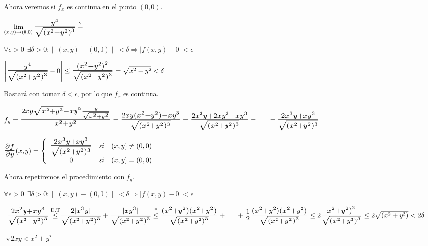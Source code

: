 \documentclass[10pt, titlepage]{article}
\newcommand{\eqc}[1]{\stackrel{\mathclap{\normalfont\mbox{\scriptsize{#1}}}}{=}}
\newcommand{\leqc}[1]{\stackrel{\mathclap{\normalfont\mbox{\scriptsize{#1}}}}{\leq}}
\newcommand{\bfrac}[2]{\scalebox{1.4}{$\frac{#1}{#2}$}}
\newcommand{\spac}{\, \, \,}
\newcommand{\limdef}[2]{$\forall \epsilon > 0 \spac \exists \delta > 0 : \|(x ,y) - #1\| < \delta \Rightarrow 
|f (x, y) - #2| < \epsilon$\vspace{3mm}

}
\begin{document}
Ahora veremos si $f_x$ es continua en el punto $(0, 0)$.
\vspace{3mm}

$\displaystyle \lim_{(x, y) \to (0, 0)} \bfrac{y^4}{\sqrt{{(x^2 + y^2)}^3}} \eqc{?}$
\vspace{3mm}

$\forall \epsilon > 0 \spac \exists \delta > 0 : \|(x ,y) - (0, 0)\| < \delta \Rightarrow |f (x, y) - 0| < \epsilon$
\vspace{3mm}

$\left | \bfrac{y^4}{\sqrt{{(x^2 + y^2)}^3}} - 0 \right | \leq \bfrac{{(x^2 + y^2)}^2}{\sqrt{{(x^2 + y^2)}
^3}} = \sqrt{x^2 - y^2} < \delta$
\vspace{3mm}

Bastará con tomar $\delta < \epsilon$, por lo que $f_x$ es continua.
\vspace{5mm}

$f_y = \bfrac{2xy \sqrt{x^2 + y^2} - xy^2 \frac{y}{\sqrt{x^2 + y^2}}}{x^2 + y^2} = \bfrac{2xy (x^2 + 
y^2) - xy^3}{\sqrt{{(x^2 + y^2)^3}}} = \bfrac{2x^3y + 2xy^3 - xy^3}{\sqrt{{(x^2 + y^2)^3}}} = 
\\ \indent = \bfrac{2x^3y + xy^3}{\sqrt{{(x^2 + y^2)^3}}}$
\vspace{3mm}

$\bfrac{\partial f}{\partial y} (x, y) = \left \{
\begin{array}{ccc}

\bfrac{2x^3y + xy^3}{\sqrt{{(x^2 + y^2)^3}}} & si & (x, y) \neq (0, 0)\\
0 & si & (x, y) = (0, 0)\\

\end{array}\right .
$
\vspace{3mm}

Ahora repetiremos el procedimiento con $f_y$.
\vspace{3mm}

\limdef{(0, 0)}{0}

$\left | \bfrac{2x^2y + xy^3}{\sqrt{{(x^2 + y^2)}^3}} \right | \leqc{D.T} \bfrac{2 |x^3y|}{\sqrt{{(x^2 + 
y^2)}^3}} + \bfrac{|xy^3|}{\sqrt{{(x^2 + y^2)}^3}} \leqc{*} \bfrac{(x^2 + y^2)(x^2 + y^2)}
{\sqrt{{(x^2 + y^2)}^3}} + \\ \indent + \bfrac{1}{2} \bfrac{(x^2 + y^2)(x^2 + y^2)}{\sqrt{{(x^2 + 
y^2)}^3}} \leq 2 \bfrac{{x^2 + y^2)}^2}{\sqrt{{(x^2 + y^2)}^3}} \leq 2 \sqrt{(x^2 + y^2)} < 2 \delta$
\vspace{3mm}

$ \, \star 2xy < x^2 + y^2$
\vspace{3mm}
\end{document}
